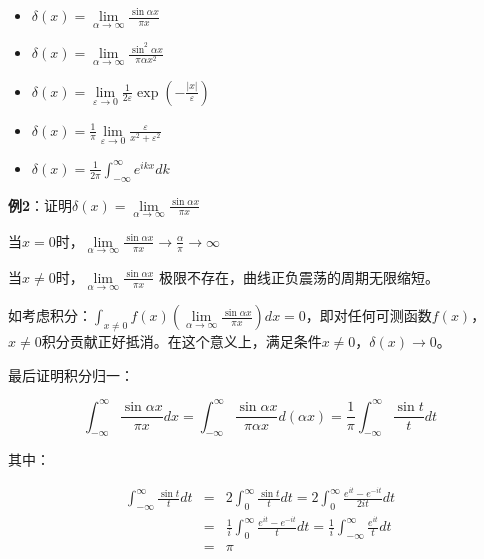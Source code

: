 \begin{itemize}
    \item $\delta (x) = \mathop {\lim }\limits_{\alpha  \to \infty } \frac{{\sin \alpha x}}{{\pi x}}$

    \item $\delta (x) = \mathop {\lim }\limits_{\alpha  \to \infty } \frac{{\sin ^2 \alpha x}}{{\pi \alpha x^2 }}$

    \item $\delta (x) = \mathop {\lim }\limits_{\varepsilon  \to 0} \frac{1}{{2\varepsilon }}\exp \left( { - \frac{{\left| x \right|}}{\varepsilon }} \right)$

    \item $\delta (x) = \frac{1}{\pi }\mathop {\lim }\limits_{\varepsilon  \to 0} \frac{\varepsilon }{{x^2  + \varepsilon ^2 }}$

    \item $\delta (x) = \frac{1}{{2\pi }}\int_{ - \infty }^\infty  {e^{ikx} dk} $

   \end{itemize}

\textbf{例2}：证明$\delta (x) = \mathop {\lim }\limits_{\alpha  \to \infty } \frac{{\sin \alpha x}}{{\pi x}}$

当$x=0$时，$\mathop {\lim }\limits_{\alpha  \to \infty } \frac{{\sin \alpha x}}{{\pi x}} \to \frac{\alpha }{\pi } \to \infty $

当$x \ne 0$时，$\mathop {\lim }\limits_{\alpha  \to \infty } \frac{{\sin \alpha x}}{{\pi x}}$
极限不存在，曲线正负震荡的周期无限缩短。

如考虑积分：$\int_{x \ne 0} {f(x)\left( {\mathop {\lim }\limits_{\alpha  \to \infty } \frac{{\sin \alpha x}}{{\pi x}}} \right)} dx = 0$，即对任何可测函数$f(x)$，$x \ne 0$积分贡献正好抵消。在这个意义上，满足条件$x \ne 0$，$\delta (x) \to 0$。

最后证明积分归一：

\begin{equation*}
\int_{ - \infty }^\infty  {\frac{{\sin \alpha x}}{{\pi x}}dx}  = \int_{ - \infty }^\infty  {\frac{{\sin \alpha x}}{{\pi \alpha x}}} d(\alpha x) = \frac{1}{\pi }\int_{ - \infty }^\infty  {\frac{{\sin t}}{t}dt} 
\end{equation*}

其中：

\begin{eqnarray*}
\int_{ - \infty }^\infty  {\frac{{\sin t}}{t}dt} & = & 2\int_0^\infty  {\frac{{\sin t}}{t}dt}  = 2\int_0^\infty  {\frac{{e^{it}  - e^{ - it} }}{{2it}}} dt  \\
{} & = & \frac{1}{i}\int_0^\infty  {\frac{{e^{it}  - e^{ - it} }}{t}} dt = \frac{1}{i}\int_{ - \infty }^\infty  {\frac{{e^{it} }}{t}dt} \\
{} &  = & \pi 
\end{eqnarray*}

